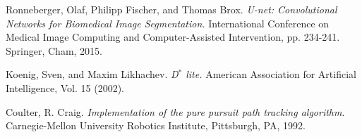 \begin{thebibliography}{7}


\begin{flushleft}
Ronneberger, Olaf, Philipp Fischer, and Thomas Brox. \textit{U-net: Convolutional Networks for Biomedical Image Segmentation.}
International Conference on Medical Image Computing and Computer-Assisted Intervention, pp. 234-241. Springer, Cham, 2015.
\end{flushleft}

\begin{flushleft}
Koenig, Sven, and Maxim Likhachev. \textit{D$^*$ lite.} American Association for Artificial Intelligence, Vol. 15 (2002).
\end{flushleft}

\begin{flushleft}
Coulter, R. Craig. \textit{Implementation of the pure pursuit path tracking algorithm}. Carnegie-Mellon University Robotics Institute, Pittsburgh, PA, 1992.
\end{flushleft}


\end{thebibliography}

